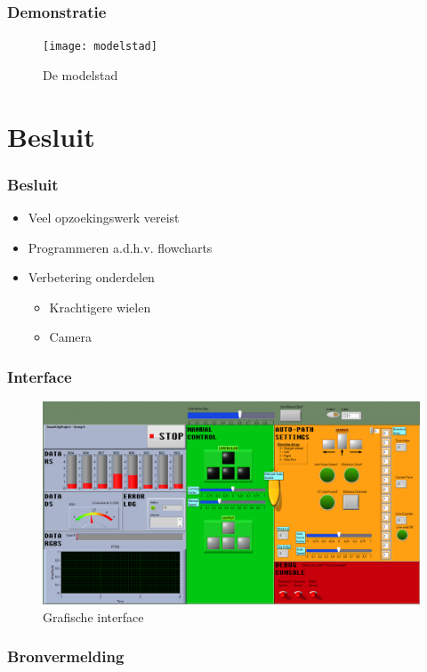 \documentclass
   [kulak,aspectratio=169,<options>] %
   {kulakbeamer}
\begin{document}
\begin{frame}
	\frametitle{Demonstratie}
	\begin{figure}
		\centering
		\texttt{[image: modelstad]}
		\caption{De modelstad}
	\end{figure}
\end{frame}

\section{Besluit}
\begin{frame}
\frametitle{Besluit}
	\begin{itemize}
	\item Veel opzoekingswerk vereist
	\item Programmeren a.d.h.v. flowcharts
	\item Verbetering onderdelen
		\begin{itemize}
		\item Krachtigere wielen
		\item Camera
		\end{itemize}
\end{itemize}
\end{frame}

\begin{frame}
	\frametitle{Interface}
	\begin{figure}
		\centering
		\includegraphics[width=.7\textwidth,]{Interface}
		\caption{Grafische interface}
	\end{figure}
\end{frame}

\begin{frame}
\frametitle{Bronvermelding}
	
	
	
\end{frame}
\end{document}
